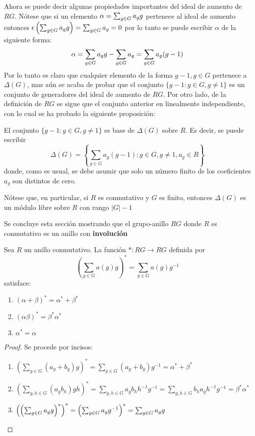 Ahora se puede decir algunas propiedades importantes del ideal de aumento de $RG$. Nótese que si un elemento $\alpha = \sum_{g \in G} a_{g} g$ pertenece al ideal de aumento entonces $ \epsilon \left( \sum_{g \in G} a_{g} g\right) = \sum_{g \in G}a_g = 0 $ por lo tanto se puede escribir $\alpha$ de la siguiente forma: 
\[\alpha = \sum_{g \in G} a_{g} g -\sum_{g \in G}a_g = \sum_{g \in G}a_g(g-1) \]
Por lo tanto es claro que cualquier elemento de la forma $g-1, g \in G$ pertenece a $\Delta(G)$, mas aún se acaba de probar que el conjunto $\{g-1 : g \in G, g \neq 1\}$ es un conjunto de generadores del ideal de aumento de $RG$. Por otro lado, de la definición de $RG$ se sigue que el conjunto anterior en linealmente independiente, con lo cual se ha probado la siguiente proposición:

\begin{proposicion} \label{gen}
El conjunto $\{ g-1 : g \in G , g \neq 1\}$ es base de $\Delta (G)$ sobre $R$. Es decir, se puede escribir
\begin{equation*}
\Delta (G) = \left\{ \sum_{g \in G} a_g(g-1) : g \in G , g \neq 1, a_g \in R \right\}
\end{equation*}
donde, como es usual, se debe asumir que solo un número finito de los coeficientes $a_g$ son distintos de cero.
\end{proposicion}

Nótese que, en particular, si $R$ es conmutativo y $G$ es finito, entonces $\Delta (G)$ es un módulo libre sobre $R$ con rango $|G|-1$

Se concluye esta sección mostrando que el grupo-anillo $RG$ donde $R$ es conmutativo es un anillo con \textbf{involución}

\begin{proposicion}\label{prep:conjugacion}
Sea $R$ un anillo conmutativo. La función $* \colon RG \to RG$ definida por 
\begin{equation}
\left(\sum_{g \in G}a(g)g\right)^* = \sum_{g \in G} a(g) g^{-1}
\end{equation}
satisface: 

\begin{enumerate}
\item $(\alpha + \beta)^* = \alpha^* + \beta^*$
\item $(\alpha\beta)^* = \beta^*\alpha^*$
\item $\alpha^* = \alpha$
\end{enumerate}
\end{proposicion}


\begin{proof}
Se procede por incisos:
\begin{enumerate}
\item $\left( \sum_{g \in G} (a_g +b_g)g\right)^* =  \sum_{g \in G} (a_g +b_g)g^{-1} = \alpha^* + \beta^*$
\item  $\left( \sum_{g, h \in G} (a_gb_h)gh\right)^* = \sum_{g,h \in G} a_gb_hh^{-1}g^{-1} = \sum_{g,h \in G} b_h a_g h^{-1}g^{-1} = \beta^*\alpha^*$
\item  $\left(\left( \sum_{g \in G} a_{g} g\right)^*\right)^* = \left(\sum_{g\in G}a_gg^{-1}\right)^* = \sum_{g \in G} a_{g} g$ \qedhere
\end{enumerate}
\end{proof}


